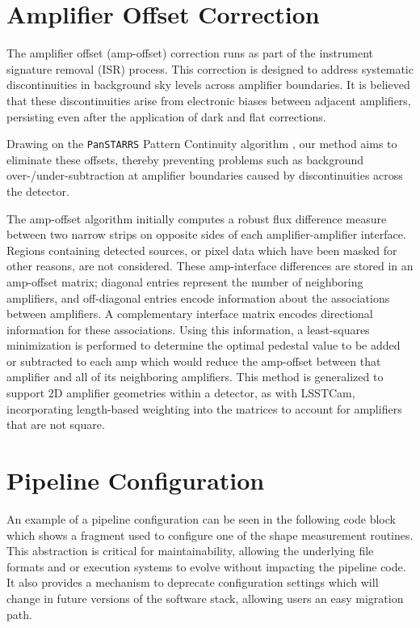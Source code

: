 \section{Amplifier Offset Correction}
\label{sec:ampoffset}
The amplifier offset (amp-offset) correction runs as part of the instrument signature removal (ISR) process.
This correction is designed to address systematic discontinuities in background sky levels across amplifier boundaries.
It is believed that these discontinuities arise from electronic biases between adjacent amplifiers, persisting even after the application of dark and flat corrections.

Drawing on the \texttt{PanSTARRS} Pattern Continuity algorithm \citep{2020ApJS..251....4W}, our method aims to eliminate these offsets, thereby preventing problems such as background over-/under-subtraction at amplifier boundaries caused by discontinuities across the detector.

The amp-offset algorithm initially computes a robust flux difference measure between two narrow strips on opposite sides of each amplifier-amplifier interface.
Regions containing detected sources, or pixel data which have been masked for other reasons, are not considered.
These amp-interface differences are stored in an amp-offset matrix; diagonal entries represent the number of neighboring amplifiers, and off-diagonal entries encode information about the associations between amplifiers.
A complementary interface matrix encodes directional information for these associations.
Using this information, a least-squares minimization is performed to determine the optimal pedestal value to be added or subtracted to each amp which would reduce the amp-offset between that amplifier and all of its neighboring amplifiers.
This method is generalized to support 2D amplifier geometries within a detector, as with LSSTCam, incorporating length-based weighting into the matrices to account for amplifiers that are not square.

\section{Pipeline Configuration}
\label{sec:appendix_config}

An example of a pipeline configuration can be seen in the following code block which shows a fragment used to configure one of the shape measurement routines.
This abstraction is critical for maintainability, allowing the underlying file formats and or execution systems to evolve without impacting the pipeline code.
It also provides a mechanism to deprecate configuration settings which will change in future versions of the software stack, allowing users an easy migration path.

